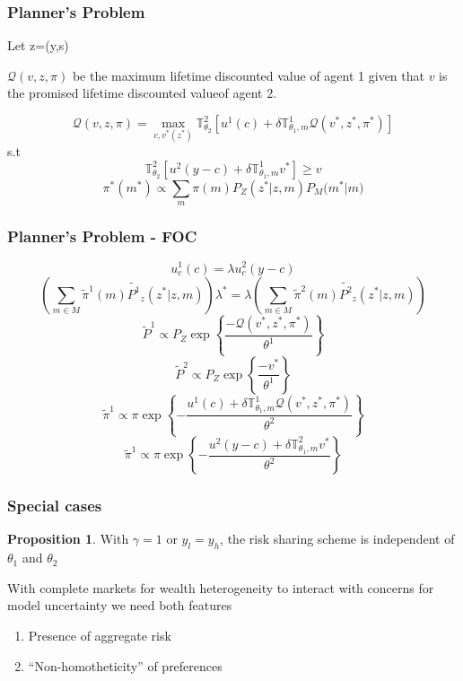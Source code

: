 \documentclass{beamer}
\theoremstyle{definition}
\newtheorem{proposition}{Proposition}%
\begin{document}
\begin{frame}
\frametitle{Planner's Problem}
Let z=(y,s)

$\mathcal{Q}(v,z,\pi)$ be the maximum lifetime discounted value of agent 1 given that $v$ is the promised lifetime discounted valueof agent 2.

\[\mathcal{Q}(v,z,\pi)=\max_{c,v^*(z^*)} \mathbb{T}_{\theta_2}^{2}\left[u^1(c)+\delta \mathbb{T}_{\theta_1,m}^{1} \mathcal{Q}(v^*,z^*,\pi^*)\right]\]
s.t
\[\mathbb{T}_{\theta_2}^2\left[u^2(y-c)+\delta \mathbb{T}_{\theta_1,m}^{1} v^*\right]\geq v\] 
\[\pi^{*}(m^*)\propto \sum_{m}{\pi(m) P_Z(z^*|z,m)P_M(m^*}|m)\]
\end{frame}
\begin{frame}
\frametitle{Planner's Problem - FOC}
\small{
\[u^1_c(c)=\lambda u^2_c(y-c)\]	
\[\left(\sum_{m \in M}\tilde{\pi}^1(m)\tilde{P^1}_z(z^* |z,m)\right)\lambda^*=\lambda\left(\sum_{m \in M}\tilde{\pi}^2(m)\tilde{P^2}_z(z^* |z,m)\right) \]
\[\tilde{P}^1 \propto P_Z\exp\left\{\frac{-\mathcal{Q}(v^*,z^*,\pi^*)}{\theta^1}\right\}\]
\[\tilde{P}^2 \propto P_Z\exp\left\{\frac{-v^*}{\theta^1}\right\}\]
\[\tilde{\pi}^1 \propto \pi \exp\left\{-\frac{ u^1(c)+\delta \mathbb{T}^1_{\theta_1,m} \mathcal{Q}(v^*,z^*,\pi^*) }{\theta^2}\right\}\]
\[\tilde{\pi}^1 \propto \pi \exp\left\{-\frac{u^2(y-c)+\delta \mathbb{T}^2_{\theta_1,m} v^*}{\theta^2}\right\}\]
}
\end{frame}

\begin{frame}
\frametitle{Special cases}
\begin{proposition}
\label{propo-2}
With $\gamma=1$ or $y_{l}=y_{h}$, the risk sharing scheme is independent of $\theta_1$ and $\theta_2$
\end{proposition}
With complete markets for wealth heterogeneity to interact with concerns for model uncertainty we need both features
\begin{enumerate}
	\item Presence of aggregate risk 
	\item ``Non-homotheticity'' of preferences
\end{enumerate}
\end{frame}
\end{document}
